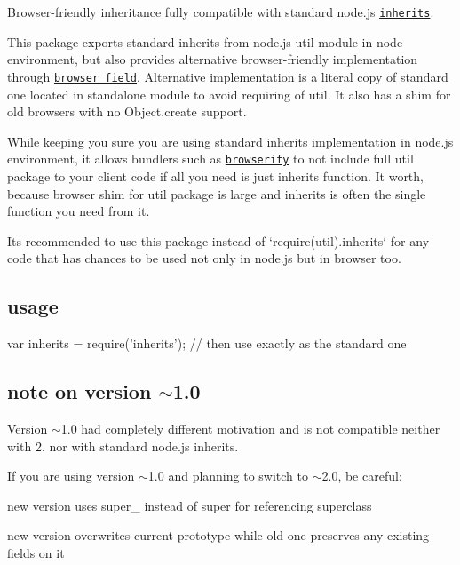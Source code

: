 Browser-\/friendly inheritance fully compatible with standard node.\+js \href{http://nodejs.org/api/util.html#util_util_inherits_constructor_superconstructor}{\tt inherits}.

This package exports standard {\ttfamily inherits} from node.\+js {\ttfamily util} module in node environment, but also provides alternative browser-\/friendly implementation through \href{https://gist.github.com/shtylman/4339901}{\tt browser field}. Alternative implementation is a literal copy of standard one located in standalone module to avoid requiring of {\ttfamily util}. It also has a shim for old browsers with no {\ttfamily Object.\+create} support.

While keeping you sure you are using standard {\ttfamily inherits} implementation in node.\+js environment, it allows bundlers such as \href{https://github.com/substack/node-browserify}{\tt browserify} to not include full {\ttfamily util} package to your client code if all you need is just {\ttfamily inherits} function. It worth, because browser shim for {\ttfamily util} package is large and {\ttfamily inherits} is often the single function you need from it.

It\textquotesingle{}s recommended to use this package instead of `require(\textquotesingle{}util\textquotesingle{}).inherits` for any code that has chances to be used not only in node.\+js but in browser too.

\subsection*{usage}


\begin{DoxyCode}
var inherits = require(\textcolor{stringliteral}{'inherits'});
\textcolor{comment}{// then use exactly as the standard one}
\end{DoxyCode}


\subsection*{note on version $\sim$1.0}

Version $\sim$1.0 had completely different motivation and is not compatible neither with 2. nor with standard node.\+js {\ttfamily inherits}.

If you are using version $\sim$1.0 and planning to switch to $\sim$2.0, be careful\+:


\begin{DoxyItemize}
\item new version uses {\ttfamily super\+\_\+} instead of {\ttfamily super} for referencing superclass
\item new version overwrites current prototype while old one preserves any existing fields on it 
\end{DoxyItemize}